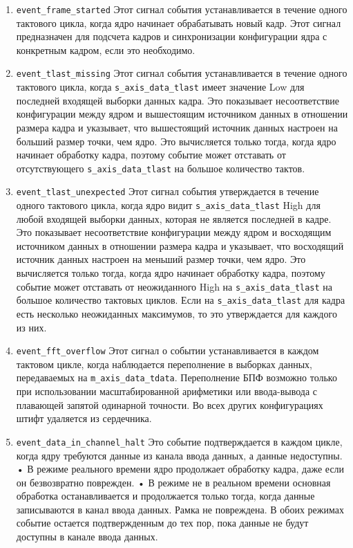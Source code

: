\begin{enumerate}
	\item \verb|event_frame_started| Этот сигнал события устанавливается в течение одного тактового цикла, когда ядро начинает обрабатывать новый кадр. Этот сигнал предназначен для подсчета кадров и синхронизации конфигурации ядра с конкретным кадром, если это необходимо.
	\item \verb|event_tlast_missing|
	Этот сигнал события устанавливается в течение одного тактового цикла, когда \verb|s_axis_data_tlast| имеет значение Low для последней входящей выборки данных кадра. Это показывает несоответствие конфигурации между ядром и вышестоящим источником данных в отношении размера кадра и указывает, что вышестоящий источник данных настроен на больший размер точки, чем ядро. Это вычисляется только тогда, когда ядро начинает обработку кадра, поэтому событие может отставать от отсутствующего \verb|s_axis_data_tlast| на большое количество тактов.
	\item \verb|event_tlast_unexpected|
	Этот сигнал события утверждается в течение одного тактового цикла, когда ядро видит \verb|s_axis_data_tlast| High для любой входящей выборки данных, которая не является последней в кадре. Это показывает несоответствие конфигурации между ядром и восходящим источником данных в отношении размера кадра и указывает, что восходящий источник данных настроен на меньший размер точки, чем ядро. Это вычисляется только тогда, когда ядро начинает обработку кадра, поэтому событие может отставать от неожиданного High на \verb|s_axis_data_tlast| на большое количество тактовых циклов. Если на \verb|s_axis_data_tlast| для кадра есть несколько неожиданных максимумов, то это утверждается для каждого из них.
	\item \verb|event_fft_overflow|
	Этот сигнал о событии устанавливается в каждом тактовом цикле, когда наблюдается переполнение в выборках данных, передаваемых на \verb|m_axis_data_tdata|. Переполнение БПФ возможно только при использовании масштабированной арифметики или ввода-вывода с плавающей запятой одинарной точности. Во всех других конфигурациях штифт удаляется из сердечника.
	\item \verb|event_data_in_channel_halt|
	Это событие подтверждается в каждом цикле, когда ядру требуются данные из канала ввода данных, а данные недоступны. • В режиме реального времени ядро продолжает обработку кадра, даже если он безвозвратно поврежден. • В режиме не в реальном времени основная обработка останавливается и продолжается только тогда, когда данные записываются в канал ввода данных. Рамка не повреждена. В обоих режимах событие остается подтвержденным до тех пор, пока данные не будут доступны в канале ввода данных.

\end{enumerate}
